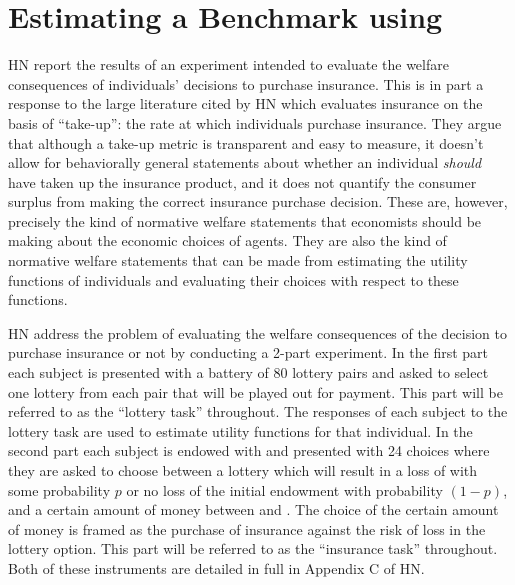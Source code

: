 \documentclass[../main.tex]{subfiles}
\begin{document}
\section{Estimating a Benchmark using \texorpdfstring{\textcite{Harrison2016}}{Harrison and Ng (2015)}}
\label{sec4:Bench}

HN report the results of an experiment intended to evaluate the welfare consequences of individuals' decisions to purchase insurance.
This is in part a response to the large literature cited by HN \parencite*[92]{Harrison2016} which evaluates insurance on the basis of \enquote{take-up}: the rate at which individuals purchase insurance.
They argue that although a take-up metric is transparent and easy to measure, it doesn't allow for behaviorally general statements about whether an individual \textit{should} have taken up the insurance product, and it does not quantify the consumer surplus from making the correct insurance purchase decision.
These are, however, precisely the kind of normative welfare statements that economists should be making about the economic choices of agents.
They are also the kind of normative welfare statements that can be made from estimating the utility functions of individuals and evaluating their choices with respect to these functions.

HN address the problem of evaluating the welfare consequences of the decision to purchase insurance or not by conducting a 2-part experiment.
In the first part each subject is presented with a battery of 80 lottery pairs and asked to select one lottery from each pair that will be played out for payment.
This part will be referred to as the \enquote{lottery task} throughout.
The responses of each subject to the lottery task are used to estimate utility functions for that individual.
In the second part each subject is endowed with  and presented with 24 choices where they are asked to choose between a lottery which will result in a loss of  with some probability $p$ or no loss of the initial endowment with probability $(1-p)$, and a certain amount of money between  and .
The choice of the certain amount of money is framed as the purchase of insurance against the risk of loss in the lottery option.
This part will be referred to as the \enquote{insurance task} throughout.
Both of these instruments are detailed in full in Appendix C of HN.
\end{document}
